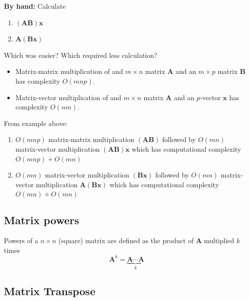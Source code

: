 \documentclass[
]{book}
\theoremstyle{definition}
\theoremstyle{definition}
\theoremstyle{definition}
\theoremstyle{definition}
\theoremstyle{remark}
\begin{document}
\textbf{By hand:} Calculate

\begin{enumerate}
\def\labelenumi{\arabic{enumi})}
\item
  \((\mathbf{A} \mathbf{B}) \mathbf{x}\)
\item
  \(\mathbf{A} (\mathbf{B} \mathbf{x})\)
\end{enumerate}

Which was easier? Which required less calculation?

\begin{itemize}
\item
  Matrix-matrix multiplication of and \(m \times n\) matrix \(\mathbf{A}\) and an \(m \times p\) matrix \(\mathbf{B}\) has complexity \(O(m n p)\).
\item
  Matrix-vector multiplication of and \(m \times n\) matrix \(\mathbf{A}\) and an \(p\)-vector \(\mathbf{x}\) has complexity \(O(n m)\).
\end{itemize}

From example above:

\begin{enumerate}
\def\labelenumi{\arabic{enumi})}
\item
  \(O(m n p)\) matrix-matrix multiplication \((\mathbf{A} \mathbf{B})\) followed by \(O(m n)\) matrix-vector multiplication \((\mathbf{A} \mathbf{B}) \mathbf{x}\) which has computational complexity \(O(m n p) + O(m n)\)
\item
  \(O(m n)\) matrix-vector multiplication \((\mathbf{B} \mathbf{x})\) followed by \(O(m n)\) matrix-vector multiplication \(\mathbf{A} (\mathbf{B} \mathbf{x})\) which has computational complexity \(O(m n) + O(m n)\)
\end{enumerate}

\hypertarget{matrix-powers}{%
\subsection{Matrix powers}\label{matrix-powers}}

Powers of a \(n \times n\) (square) matrix are defined as the product of \(\mathbf{A}\) multiplied \(k\) times
\[
\mathbf{A}^k = \underbrace{\mathbf{A} \cdots \mathbf{A}}_k
\]

\hypertarget{matrix-transpose}{%
\subsection{Matrix Transpose}\label{matrix-transpose}}
\end{document}
